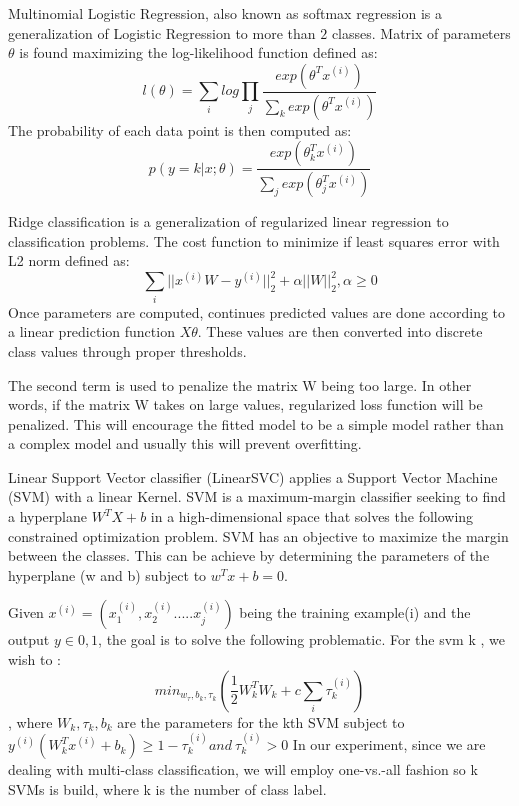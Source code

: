 Multinomial Logistic Regression, also known as softmax regression is a generalization of Logistic Regression to more than $2$ classes.
Matrix of parameters $\theta$ is found maximizing the log-likelihood function defined as:
\begin{equation}
	l(\theta) = \sum_i log \prod_j \frac{exp(\theta^Tx^{(i)})}{\sum_k exp(\theta^Tx^{(i)})}
\label{eq:softmax-likelihood}
\end{equation}
The probability of each data point is then computed as:
\begin{equation}
 p(y=k|x;\theta)=\frac{exp(\theta^T_k x^{(i)})}{\sum_j exp(\theta_j^T x^{(i)})}
\label{eq:softmax-prob}
\end{equation}

Ridge classification is a generalization of regularized linear regression to classification problems.
The cost function to minimize if least squares error with L2 norm defined as:
\begin{equation}
\sum_i ||x^{(i)}W-y^{(i)}||_2^2 + \alpha ||W||_2^2, \alpha\geq 0
\label{eq:ridge-cost}
\end{equation}
Once parameters are computed, continues predicted values are done according to a linear prediction function $X\theta$. These values are then converted into discrete class values through proper thresholds.


The second term is used to penalize the matrix W being too large. In other words, if the matrix W takes on large values, regularized loss function will be penalized. This will encourage the fitted model to be a simple model rather than a complex model and usually this will prevent overfitting.

Linear Support Vector classifier (LinearSVC) applies a Support Vector Machine (SVM) with a linear Kernel. SVM is a maximum-margin classifier seeking to find a hyperplane $W^T X + b$ in a high-dimensional space that solves the following constrained optimization problem.
SVM has an objective to maximize the margin between the classes. This can be achieve by determining the parameters of the hyperplane (w and b) subject to $w^T x + b = 0$.


Given $x^{(i)}=(x_1^{(i)},x_2^{(i)}.....x_j^{(i)})$ being the training example(i) and the output $y \in {0,1}$, the goal is to solve the following problematic. For the svm k , we wish to :
$$min_{w_\tau,b_k,\tau_k}(\frac{1}{2}W_k^TW_k +c\sum_i \tau_k^{(i)})$$, where $W_k,\tau_k,b_k$ are the parameters for the kth SVM subject to $y^{(i)}(W^T_kx^{(i)}+b_k)\geq 1-\tau_k^{(i)} and \: \tau_k^{(i)}>0$
In our experiment, since we are dealing with multi-class classification, we will employ one-vs.-all fashion so k SVMs is build, where k is the number of class label.

